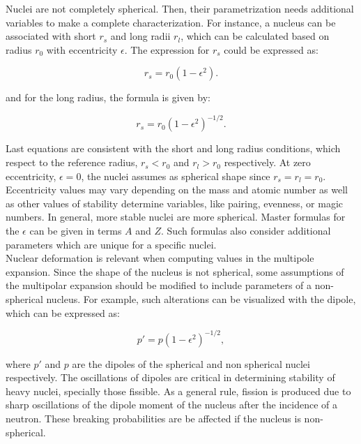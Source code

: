 \documentclass[openany]{book}
\begin{document}
Nuclei are not completely spherical. Then, their parametrization needs additional variables to make a complete characterization. For instance, a nucleus can be associated with short $r_s$ and long radii $r_l$, which can be calculated based on radius $r_0$ with eccentricity $\epsilon$. The expression for $r_s$ could be expressed as:

\begin{equation}\label{eq:nuclearDeformation_radius_short}
	r_s = r_0 (1 - \epsilon^2).
\end{equation} 

and for the long radius, the formula is given by: 

\begin{equation}\label{eq:nuclearDeformation_radius_long}
	r_s = r_0 (1 - \epsilon^2)^{-1/2}.
\end{equation} 

Last equations are consistent with the short and long radius conditions, which respect to the reference radius, $r_s < r_0$ and  $r_l > r_0$ respectively. At zero eccentricity, $\epsilon = 0$, the nuclei assumes as spherical shape since $r_s = r_l = r_0$.  \\

Eccentricity values may vary depending on the mass and atomic number as well as other values of stability determine variables, like pairing, evenness, or magic numbers. In general, more stable nuclei are more spherical. Master formulas for the $\epsilon$ can be given in terms $A$ and  $Z$. Such formulas also consider additional parameters which are unique for a specific nuclei. \\

Nuclear deformation is relevant when computing values in the multipole expansion. Since the shape of the nucleus is not spherical, some assumptions of the multipolar expansion should be modified to include parameters of a non-spherical nucleus.  For example, such alterations can be visualized with the dipole, which can be expressed as: 

 \begin{equation}\label{eq:nuclearDeformation_dipole}
	p' = p (1 - \epsilon^2)^{-1/2},
\end{equation} 

where $p'$ and $p$ are the dipoles of the spherical and non spherical nuclei respectively. The oscillations of dipoles are critical in determining stability of heavy nuclei, specially those fissible. As a general rule, fission is produced due to sharp oscillations of the dipole moment of the nucleus after the incidence of a neutron. These breaking probabilities are be affected if the nucleus is non-spherical. \\ 
\end{document}
